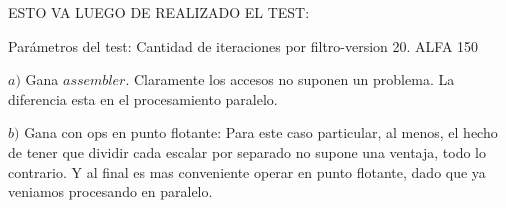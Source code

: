 ESTO VA LUEGO DE REALIZADO EL TEST:

Parámetros del test: 
Cantidad de iteraciones por filtro-version 20.
ALFA 150

$a)$ Gana $assembler$. Claramente los accesos no suponen un problema. La diferencia esta en el procesamiento paralelo.

$b)$ Gana con ops en punto flotante: Para este caso particular, al menos, el hecho de tener que dividir cada escalar por separado no supone una ventaja, todo lo contrario. Y al final es mas conveniente operar en punto flotante, dado que ya veniamos procesando en paralelo.
